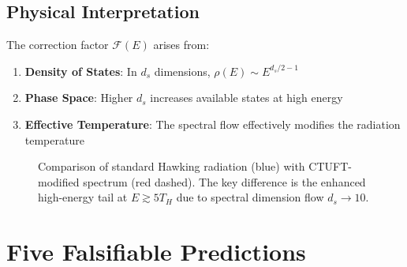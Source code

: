 \subsection{Physical Interpretation}
\label{subsec:physical-interpretation}

The correction factor $\mathcal{F}(E)$ arises from:
\begin{enumerate}
    \item \textbf{Density of States}: In $d_s$ dimensions, $\rho(E) \sim E^{d_s/2 - 1}$
    \item \textbf{Phase Space}: Higher $d_s$ increases available states at high energy
    \item \textbf{Effective Temperature}: The spectral flow effectively modifies the radiation temperature
\end{enumerate}

\begin{figure}[htbp]
\centering
{}
\caption{Comparison of standard Hawking radiation (blue) with CTUFT-modified spectrum (red dashed). The key difference is the enhanced high-energy tail at $E \gtrsim 5T_H$ due to spectral dimension flow $d_s \to 10$.}
\label{fig:hawking-comparison}
\end{figure}

\section{Five Falsifiable Predictions}
\label{sec:falsifiable-predictions}

